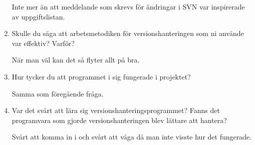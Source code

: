 \begin{enumerate}
  Inte mer än att meddelande som skrevs för ändringar i SVN var inspirerade av uppgiftslistan.

  \item Skulle du säga att arbetsmetodiken för versionshanteringen som ni använde var effektiv? Varför?

  När man väl kan det så flyter allt på bra.

  \item Hur tycker du att programmet i sig fungerade i projektet?

  Samma som föregående fråga.

  \item Var det svårt att lära sig versionshanteringsprogrammet? Fanns det programvara som gjorde versionshanteringen blev lättare att hantera?

  Svårt att komma in i och svårt att våga då man inte visste hur det fungerade.

\end{enumerate}





